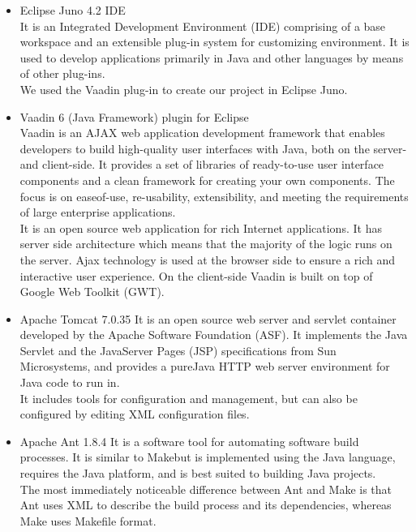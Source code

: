 \documentclass[amsart, 12pt]{article}
\begin{document}
\begin{itemize}
\item Eclipse Juno 4.2 IDE \\
It is an Integrated Development Environment (IDE) comprising of a base workspace and an extensible plug-in system for customizing environment. It is used to develop applications primarily in Java and other languages by means of other plug-ins.\\
We used the Vaadin plug-in to create our project in Eclipse Juno.

\item Vaadin 6 (Java Framework) plugin for Eclipse \\
Vaadin is an AJAX web application development framework that enables developers to build high-quality user interfaces with Java, both on the server- and client-side. It provides a set of libraries of ready-to-use user interface components and a clean framework for creating your own components. The focus is on easeof-use, re-usability, extensibility, and meeting the requirements of large enterprise applications.\\
It is an open source web application for rich Internet applications. It has server side architecture which means that the majority of the logic runs on the server. Ajax technology is used at the browser side to ensure a rich and interactive user experience. On the client-side Vaadin is built on top of Google Web Toolkit (GWT).\\

\item Apache Tomcat 7.0.35
It is an open source web server and servlet container developed by the Apache Software Foundation (ASF). It implements the Java Servlet and the JavaServer Pages (JSP) specifications from Sun Microsystems, and provides a \textgravedbl pure\textacutedbl Java HTTP web server environment for Java code to run in. \\
It includes tools for configuration and management, but can also be configured by editing XML configuration files.

\item Apache Ant 1.8.4
It is a software tool for automating software build processes. It is similar to \textasciigrave Make\textasciiacute but is implemented using the Java language, requires the Java platform, and is best suited to building Java projects.\\
The most immediately noticeable difference between Ant and Make is that Ant uses XML to describe the build process and its dependencies, whereas Make uses Makefile format.


\end{itemize}
\end{document}
